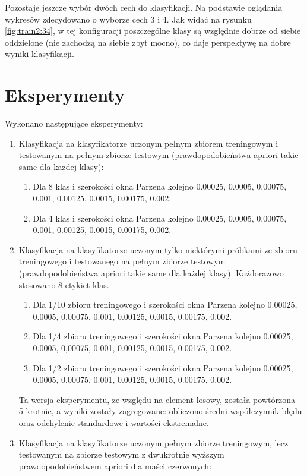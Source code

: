 \documentclass{article}
\begin{document}
	Pozostaje jeszcze wybór dwóch cech do klasyfikacji. Na podstawie oglądania wykresów zdecydowano o wyborze cech 3 i 4. Jak widać na rysunku \ref{fig:train2:34}, w tej konfiguracji poszczególne klasy są względnie dobrze od siebie oddzielone (nie zachodzą na siebie zbyt mocno), co daje perspektywę na dobre wyniki klasyfikacji. 
	
	\section{Eksperymenty} \label{sec:experiments}
	
	Wykonano następujące eksperymenty:
	\begin{enumerate}
		\item Klasyfikacja na klasyfikatorze uczonym pełnym zbiorem treningowym i testowanym na pełnym zbiorze testowym (prawdopodobieństwa apriori takie same dla każdej klasy):
		\begin{enumerate}
			\item Dla 8 klas i szerokości okna Parzena kolejno 0.00025, 0.0005, 0.00075, 0.001, 0.00125, 0.0015, 0.00175, 0.002. 
			\item Dla 4 klas i szerokości okna Parzena kolejno 0.00025, 0.0005, 0.00075, 0.001, 0.00125, 0.0015, 0.00175, 0.002.
		\end{enumerate}
	    \item Klasyfikacja na klasyfikatorze uczonym tylko niektórymi próbkami ze zbioru treningowego i testowanego na pełnym zbiorze testowym (prawdopodobieństwa apriori takie same dla każdej klasy). Każdorazowo stosowano 8 etykiet klas.
	    \begin{enumerate}
	    	\item Dla 1/10 zbioru treningowego i szerokości okna Parzena kolejno 0.00025, 0.0005, 0,00075, 0.001, 0.00125, 0.0015, 0.00175, 0.002.
	    	\item Dla 1/4 zbioru treningowego i szerokości okna Parzena kolejno 0.00025, 0.0005, 0,00075, 0.001, 0.00125, 0.0015, 0.00175, 0.002.
	    	\item Dla 1/2 zbioru treningowego i szerokości okna Parzena kolejno 0.00025, 0.0005, 0,00075, 0.001, 0.00125, 0.0015, 0.00175, 0.002.
	    \end{enumerate}
        Ta wersja eksperymentu, ze względu na element losowy, została powtórzona 5-krotnie, a wyniki zostały zagregowane: obliczono średni współczynnik błędu oraz odchylenie standardowe i wartości ekstremalne. 
        \item Klasyfikacja na klasyfikatorze uczonym pełnym zbiorze treningowym, lecz testowanym na zbiorze testowym z dwukrotnie wyższym prawdopodobieństwem apriori dla maści czerwonych:

\end{enumerate}
\end{document}
